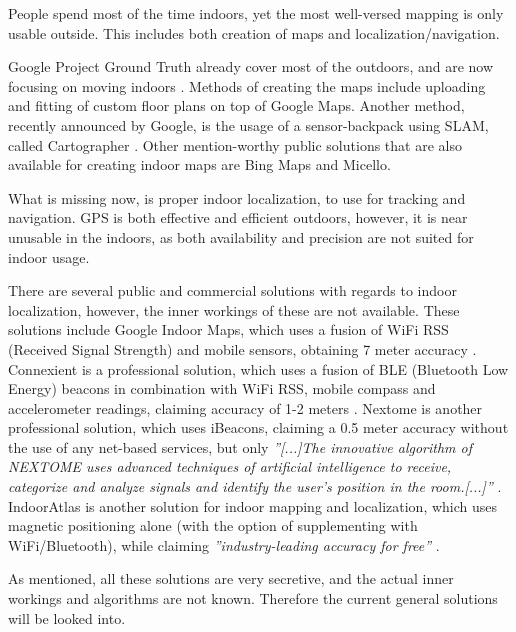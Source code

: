 
People spend most of the time indoors, yet the most well-versed mapping is only usable outside.
This includes both creation of maps and localization/navigation.

Google Project Ground Truth\cite{googleio_ground_truth} already cover most of the outdoors, and are now focusing on moving indoors \cite{googleio_indoor_maps}\cite{indoor_maps_google_slides}.
Methods of creating the maps include uploading and fitting of custom floor plans on top of Google Maps.
Another method, recently announced by Google, is the usage of a sensor-backpack using SLAM, called Cartographer \cite{cartographer}.
Other mention-worthy public solutions that are also available for creating indoor maps are Bing Maps\cite{bingmaps} and Micello\cite{micello}.

What is missing now, is proper indoor localization, to use for tracking and navigation.
GPS is both effective and efficient outdoors, however, it is near unusable in the indoors, as both availability and precision are not suited for indoor usage.

There are several public and commercial solutions with regards to indoor localization, however, the inner workings of these are not available.
These solutions include Google Indoor Maps, which uses a fusion of WiFi RSS (Received Signal Strength) and mobile sensors, obtaining 7 meter accuracy \cite{googleio_indoor_maps}.
Connexient is a professional solution, which uses a fusion of BLE (Bluetooth Low Energy) beacons in combination with WiFi RSS, mobile compass and accelerometer readings, claiming accuracy of 1-2 meters \cite{connexient_indoor_pos}.
Nextome is another professional solution, which uses iBeacons\cite{ibeacon}, claiming a 0.5 meter accuracy without the use of any net-based services, but only \textit{''[...]The innovative algorithm of NEXTOME uses advanced techniques of artificial intelligence to receive, categorize and analyze signals and identify the user’s position in the room.[...]''} \cite{nextome_indoor_pos}.
IndoorAtlas is another solution for indoor mapping and localization, which uses magnetic positioning alone (with the option of supplementing with WiFi/Bluetooth), while claiming \textit{''industry-leading accuracy for free''} \cite{indooratlas_features}.

As mentioned, all these solutions are very secretive, and the actual inner workings and algorithms are not known.
Therefore the current general solutions will be looked into.
